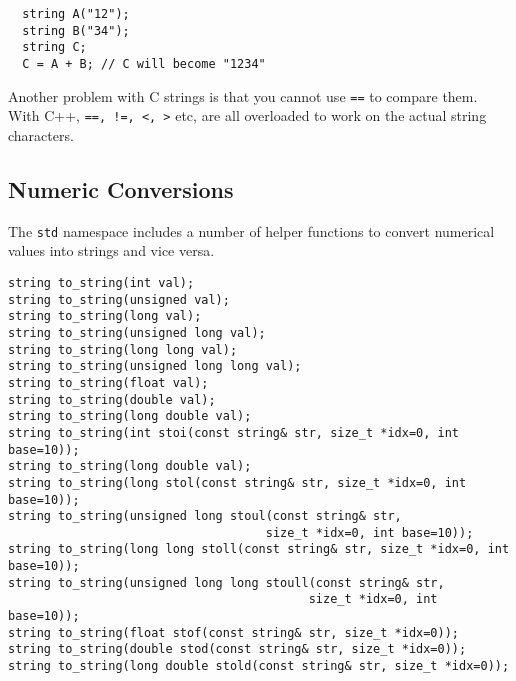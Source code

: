 \documentclass{article}
\begin{document}
\begin{verbatim}
  string A("12");
  string B("34");
  string C;
  C = A + B; // C will become "1234"
\end{verbatim}


Another problem with C strings is that you cannot use \texttt{==} to compare them. With C++,
\texttt{==, !=, <, >} etc, are all overloaded to work on the actual string characters.

\subsection{Numeric Conversions}

The \texttt{std} namespace includes a number of helper functions to convert numerical values into
strings and vice versa.

\begin{verbatim}
string to_string(int val);
string to_string(unsigned val);
string to_string(long val);
string to_string(unsigned long val);
string to_string(long long val);
string to_string(unsigned long long val);
string to_string(float val);
string to_string(double val);
string to_string(long double val);
string to_string(int stoi(const string& str, size_t *idx=0, int base=10));
string to_string(long double val);
string to_string(long stol(const string& str, size_t *idx=0, int base=10));
string to_string(unsigned long stoul(const string& str, 
                                    size_t *idx=0, int base=10));
string to_string(long long stoll(const string& str, size_t *idx=0, int base=10));
string to_string(unsigned long long stoull(const string& str, 
                                          size_t *idx=0, int base=10));
string to_string(float stof(const string& str, size_t *idx=0));
string to_string(double stod(const string& str, size_t *idx=0));
string to_string(long double stold(const string& str, size_t *idx=0));
\end{verbatim}
\end{document}
